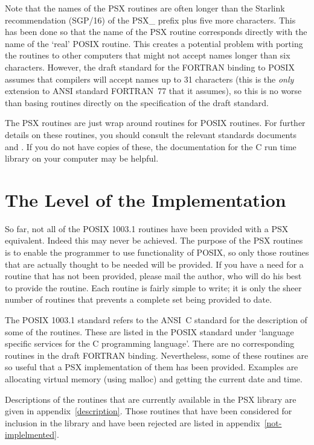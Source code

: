 Note that the names of the PSX routines are often longer than the Starlink
recommendation (SGP/16) of the PSX\_ prefix plus five more characters. This has
been done so that the name of the PSX routine corresponds directly with 
the name of the `real' POSIX routine. This creates a potential problem with
porting the routines to other computers that might not accept names longer than
six characters. However, the draft standard for the FORTRAN binding to POSIX
assumes that compilers will accept names up to 31 characters (this is the {\em
only}\, extension to ANSI standard FORTRAN~77 that it assumes), so this is no
worse than basing routines directly on the specification of the draft standard.

The PSX routines are just wrap around routines for POSIX routines. For further
details on these routines, you should consult the relevant standards documents
\cite{psx:std} and \cite{c:std}. If you do not have copies of these, the
documentation for the C run time library on your computer may be helpful.

\section{The Level of the Implementation}

So far, not all of the POSIX 1003.1 routines have been provided with a PSX
equivalent. Indeed this may never be achieved. The purpose of the PSX routines
is to enable the programmer to use functionality of POSIX, so only those
routines that are actually thought to be needed will be provided. If you have a
need for a routine that has not been provided, please mail the author, who will
do his best to provide the routine. Each routine is fairly simple to write; it
is only the sheer number of routines that prevents a complete set being
provided to date.

The POSIX 1003.1 standard refers to the ANSI~C standard for the description of
some of the routines. These are listed in the POSIX standard under `language
specific services for the C programming language'. There are no corresponding
routines in the draft FORTRAN binding. Nevertheless, some of these routines are
so useful that a PSX implementation of them has been provided. Examples are
allocating virtual memory (using malloc) and getting the current date and time.

Descriptions of the routines that are currently available in the PSX library
are given in appendix~\ref{description}. Those routines that have been
considered for inclusion in the library and have been rejected are listed in
appendix~\ref{not-implelmented}.

